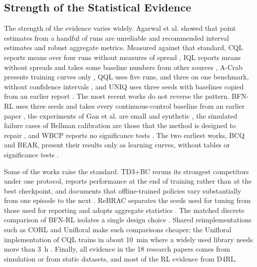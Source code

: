 \documentclass[conference]{IEEEtran}
\begin{document}
\subsection{Strength of the Statistical Evidence}
The strength of the evidence varies widely. Agarwal et al. \cite{agarwal2021precipice} showed that point estimates from a handful of runs are unreliable and recommended interval estimates and robust aggregate metrics. Measured against that standard, CQL reports means over four runs without measures of spread \cite{kumar2020cql}, IQL reports means without spreads and takes some baseline numbers from other sources \cite{kostrikov2022iql}, A-Crab presents training curves only \cite{zhu2023acrab}, QQL uses five runs, and three on one benchmark, without confidence intervals \cite{gao2026qql}, and UNIQ uses three seeds with baselines copied from an earlier report \cite{upadhyay2026uniq}. The most recent works do not reverse the pattern. BFN-RL uses three seeds and takes every continuous-control baseline from an earlier paper \cite{killingberg2026bfn}, the experiments of Gan et al. are small and synthetic \cite{gan2025conformal}, the simulated failure cases of Bellman calibration are those that the method is designed to repair \cite{vanderlaan2026bellman}, and WBCP reports no significance tests \cite{lou2026wbcp}. The two earliest works, BCQ and BEAR, present their results only as learning curves, without tables or significance tests \cite{fujimoto2019bcq,kumar2019bear}.

Some of the works raise the standard. TD3+BC reruns its strongest competitors under one protocol, reports performance at the end of training rather than at the best checkpoint, and documents that offline-trained policies vary substantially from one episode to the next \cite{fujimoto2021td3bc}. ReBRAC separates the seeds used for tuning from those used for reporting and adopts aggregate statistics \cite{tarasov2023rebrac}. The matched discrete comparison of BFN-RL isolates a single design choice \cite{killingberg2026bfn}. Shared reimplementations such as CORL \cite{tarasov2023corl} and Unifloral make such comparisons cheaper; the Unifloral implementation of CQL trains in about 10~min where a widely used library needs more than 3~h \cite{jackson2025unifloral}. Finally, all evidence in the 18 research papers comes from simulation or from static datasets, and most of the RL evidence from D4RL.
\end{document}

